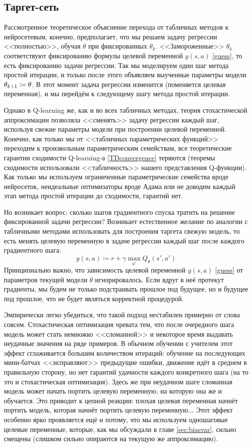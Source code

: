 \subsection{Таргет-сеть}

Рассмотренное теоретическое объяснение перехода от табличных методов к нейросетевым, конечно, предполагает, что мы решаем задачу регрессии <<полностью>>, обучая $\theta$ при фиксированных $\theta_k$. <<Замороженные>> $\theta_k$ соответствуют фиксированию формулы целевой переменной $y(s, a)$ \eqref{guess}, то есть фиксированию задачи регрессии. Так мы моделируем один шаг метода простой итерации, и только после этого объявляем выученные параметры модели $\theta_{k+1} \HM\coloneqq \theta$. В этот момент задача регрессии изменится (поменяется целевая переменная), и мы перейдём к следующему шагу метода простой итерации. 

Однако в Q-learning же, как и во всех табличных методах, теория стохастической аппроксимации позволяла <<сменять>> задачу регрессии каждый шаг, используя свежие параметры модели при построении целевой переменной. Конечно, как только мы от <<табличных параметрических функций>> переходим к произвольным параметрическим семействам, все теоретические гарантии сходимости Q-learning-а \ref{TDconvergence} теряются (теоремы сходимости использовали <<табличность>> нашего представления Q-функции). Как только мы используем ограниченные параметрические семейства вроде нейросеток, неидеальные оптимизаторы вроде Адама или не доводим каждый этап метода простой итерации до сходимости, гарантий нет.

Но возникает вопрос: сколько шагов градиентного спуска тратить на решение фиксированной задачи регрессии? Возникает естественное желание по аналогии с табличными методами использовать для построения таргета свежую модель, то есть менять целевую переменную в задаче регрессии каждый шаг после каждого градиентного шага:
$$y(s, a) \coloneqq r + \gamma \max_{a'} Q_{\theta}(s', a')$$
Принципиально важно, что зависимость целевой переменной $y(s, a)$ \eqref{guess} от параметров текущей модели $\theta$ игнорировалось. Если вдруг в неё протекут градиенты, мы будем не только подстраивать прошлое под будущее, но и будущее под прошлое, что не будет являться корректной процедурой. 

Эмпирически легко убедиться, что такой подход нестабилен примерно от слова совсем. Стохастическая оптимизация чревата тем, что после очередного шага модель может стать немножко <<сломанной>> и некоторое время выдавать неудачные значения на ряде примеров. В обычном обучении с учителем этот эффект сглаживается большим количеством итераций: обучение на последующих мини-батчах <<исправляют>> предыдущие ошибки, движение идёт в среднем в правильную сторону, но нет гарантий удачности каждого конкретного шага (на то это и стохастическая оптимизация). Здесь же при неудачном шаге сломанная модель может начать портить целевую переменную, на которую она же и обучается. Это приводит к цепной реакции: плохая целевая переменная начнёт портить модель, которая начнёт портить целевую переменную... Этот эффект особенно ярко проявляется ещё и потому, что мы используем одношаговые целевые переменные, которые, как мы обсуждали в главе \ref{sec:biasvar}, сильно смещены (слишком сильно опираются на текущую же аппроксимацию).

